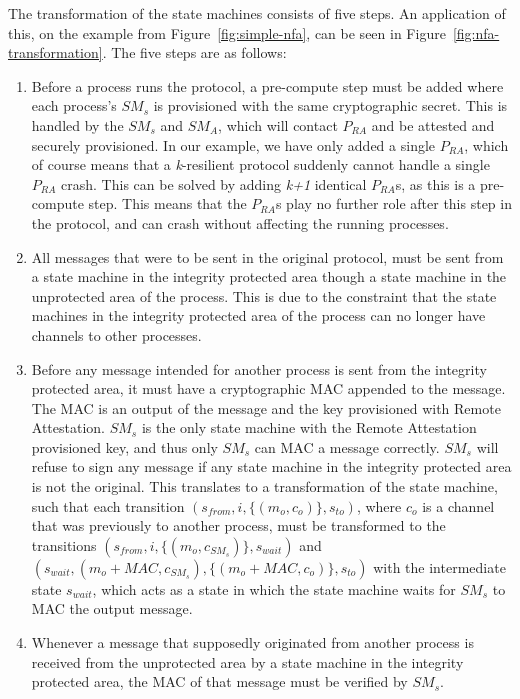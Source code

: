 \documentclass{article}
\begin{document}
	The transformation of the state machines consists of five steps.
	An application of this, on the example from Figure~\ref{fig:simple-nfa}, can be seen in Figure~\ref{fig:nfa-transformation}.
	The five steps are as follows:
	\begin{enumerate}
		\item Before a process runs the protocol, a pre-compute step must be added where each process's $SM_s$ is provisioned with the same cryptographic secret.
		This is handled by the $SM_s$ and $SM_A$, which will contact $P_{RA}$ and be attested and securely provisioned.
		In our example, we have only added a single $P_{RA}$, which of course means that a \textit{k}-resilient protocol suddenly cannot handle a single $P_{RA}$ crash.
		This can be solved by adding \textit{k+1} identical $P_{RA}$s, as this is a pre-compute step.
		This means that the $P_{RA}$s play no further role after this step in the protocol, and can crash without affecting the running processes.
		\item All messages that were to be sent in the original protocol, must be sent from a state machine in the integrity protected area though a state machine in the unprotected area of the process.
		This is due to the constraint that the state machines in the integrity protected area of the process can no longer have channels to other processes.
		\item Before any message intended for another process is sent from the integrity protected area, it must have a cryptographic MAC appended to the message.
		The MAC is an output of the message and the key provisioned with Remote Attestation.
		$SM_s$ is the only state machine with the Remote Attestation provisioned key, and thus only $SM_s$ can MAC a message correctly.
		$SM_s$ will refuse to sign any message if any state machine in the integrity protected area is not the original.
		This translates to a transformation of the state machine, such that each transition $(s_{from}, i, \{(m_o, c_o)\}, s_{to})$, where $c_o$ is a channel that was previously to another process, must be transformed to the transitions $(s_{from}, i, \{(m_o, c_{SM_s})\}, s_{wait})$ and $(s_{wait}, (m_o+MAC, c_{SM_s}), \{(m_o+MAC, c_o)\}, s_{to})$ with the intermediate state $s_{wait}$, which acts as a state in which the state machine waits for $SM_s$ to MAC the output message.
		\item Whenever a message that supposedly originated from another process is received from the unprotected area by a state machine in the integrity protected area, the MAC of that message must be verified by $SM_s$.

\end{enumerate}
\end{document}
